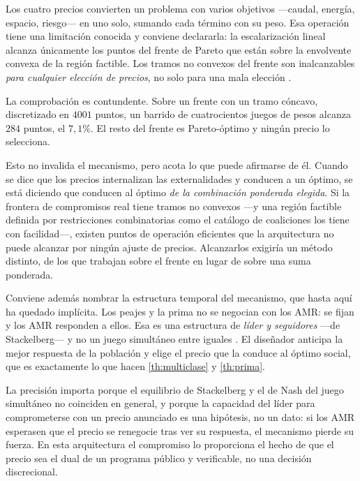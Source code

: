 \begin{observacion}
\label{obs:escalarizacion}
Los cuatro precios convierten un problema con varios objetivos —caudal, energía,
espacio, riesgo— en uno solo, sumando cada término con su peso. Esa operación
tiene una limitación conocida y conviene declararla: la escalarización lineal
alcanza únicamente los puntos del frente de Pareto que están sobre la envolvente
convexa de la región factible. Los tramos no convexos del frente son
inalcanzables \emph{para cualquier elección de precios}, no solo para una mala
elección \cite{clempner2024optimization}.

La comprobación es contundente. Sobre un frente con un tramo cóncavo,
discretizado en $4001$ puntos, un barrido de cuatrocientos juegos de pesos
alcanza $284$ puntos, el $7{,}1\%$. El resto del frente es Pareto-óptimo y
ningún precio lo selecciona.

Esto no invalida el mecanismo, pero acota lo que puede afirmarse de él. Cuando
se dice que los precios internalizan las externalidades y conducen a un óptimo,
se está diciendo que conducen al óptimo \emph{de la combinación ponderada
elegida}. Si la frontera de compromisos real tiene tramos no convexos —y una
región factible definida por restricciones combinatorias como el catálogo de
coaliciones los tiene con facilidad—, existen puntos de operación eficientes que
la arquitectura no puede alcanzar por ningún ajuste de precios. Alcanzarlos
exigiría un método distinto, de los que trabajan sobre el frente en lugar de
sobre una suma ponderada.
\end{observacion}

\begin{observacion}
\label{obs:stackelberg}
Conviene además nombrar la estructura temporal del mecanismo, que hasta aquí ha
quedado implícita. Los peajes y la prima no se negocian con los AMR: se fijan y
los AMR responden a ellos. Esa es una estructura de \emph{líder y seguidores}
—de Stackelberg— y no un juego simultáneo entre iguales
\cite{clempner2024optimization}. El diseñador anticipa la mejor respuesta de la
población y elige el precio que la conduce al óptimo social, que es exactamente
lo que hacen \cref{th:multiclase} y \cref{th:prima}.

La precisión importa porque el equilibrio de Stackelberg y el de Nash del juego
simultáneo no coinciden en general, y porque la capacidad del líder para
comprometerse con un precio anunciado es una hipótesis, no un dato: si los AMR
esperasen que el precio se renegocie tras ver su respuesta, el mecanismo pierde
su fuerza. En esta arquitectura el compromiso lo proporciona el hecho de que el
precio sea el dual de un programa público y verificable, no una decisión
discrecional.
\end{observacion}

